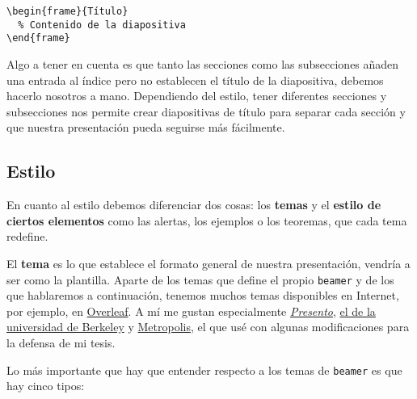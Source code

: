 \begin{lstlisting}[language={[latex]tex}]
\begin{frame}{Título}
  % Contenido de la diapositiva
\end{frame}
\end{lstlisting}

Algo a tener en cuenta es que tanto las secciones como las subsecciones
añaden una entrada al índice pero no establecen el título de la
diapositiva, debemos hacerlo nosotros a mano. Dependiendo del estilo,
tener diferentes secciones y subsecciones nos permite crear diapositivas
de título para separar cada sección y que nuestra presentación pueda
seguirse más fácilmente.

\subsection{Estilo}

En cuanto al estilo debemos diferenciar dos cosas: los \textbf{temas} y
el \textbf{estilo de ciertos elementos} como las alertas, los ejemplos o
los teoremas, que cada tema redefine.

El \textbf{tema} es lo que establece el formato general de nuestra
presentación, vendría a ser como la plantilla. Aparte de los temas que
define el propio \lstinline!beamer! y de los que hablaremos a
continuación, tenemos muchos temas disponibles en Internet, por ejemplo,
en
\href{https://www.overleaf.com/latex/templates/tagged/presentation}{Overleaf}.
A mí me gustan especialmente
\href{https://www.overleaf.com/9480607mxqxvhczzvhr\#/34336424/}{\emph{Presento}},
\href{https://www.overleaf.com/9480660qtjkqtjfqhny\#/34336601/}{el de la
universidad de Berkeley} y
\href{https://www.ctan.org/pkg/beamertheme-metropolis}{Metropolis}, el
que usé con algunas modificaciones para la defensa de mi tesis.

Lo más importante que hay que entender respecto a los temas de
\lstinline!beamer! es que hay cinco tipos:

